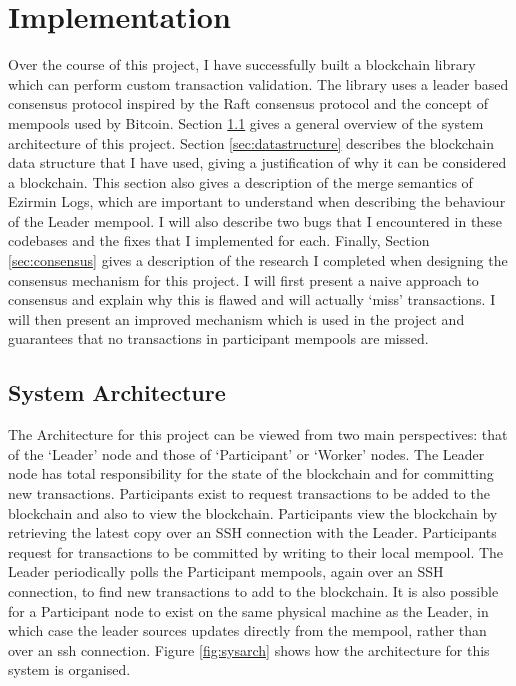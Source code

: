 \documentclass[12pt,a4paper,twoside,openright]{report}
\begin{document}
	\chapter{Implementation} \label{Implementation}
	Over the course of this project, I have successfully built a blockchain library which can perform custom transaction validation.
	The library uses a leader based consensus protocol inspired by the Raft consensus protocol and the concept of mempools used by Bitcoin.
	Section \ref{sec:sysarch} gives a general overview of the system architecture of this project.
	Section \ref{sec:datastructure} describes the blockchain data structure that I have used, giving a justification of why it can be considered a blockchain.
	This section also gives a description of the merge semantics of Ezirmin Logs, which are important to understand when describing the behaviour of the Leader mempool. 
	I will also describe two bugs that I encountered in these codebases and the fixes that I implemented for each.
	Finally, Section \ref{sec:consensus} gives a description of the research I completed when designing the consensus mechanism for this project. 
	I will first present a naive approach to consensus and explain why this is flawed and will actually `miss' transactions.
	I will then present an improved mechanism which is used in the project and guarantees that no transactions in participant mempools are missed.

	\section{System Architecture}\label{sec:sysarch}
	The Architecture for this project can be viewed from two main perspectives: that of the `Leader' node and those of `Participant' or `Worker' nodes.
	The Leader node has total responsibility for the state of the blockchain and for committing new transactions.
	Participants exist to request transactions to be added to the blockchain and also to view the blockchain. 
	Participants view the blockchain by retrieving the latest copy over an SSH connection with the Leader.
	Participants request for transactions to be committed by writing to their local mempool. 
	The Leader periodically polls the Participant mempools, again over an SSH connection, to find new transactions to add to the blockchain.
	It is also possible for a Participant node to exist on the same physical machine as the Leader, in which case the leader sources updates directly from the mempool, rather than over an ssh connection. 
	Figure \ref{fig:sysarch} shows how the architecture for this system is organised.\\	
\end{document}
